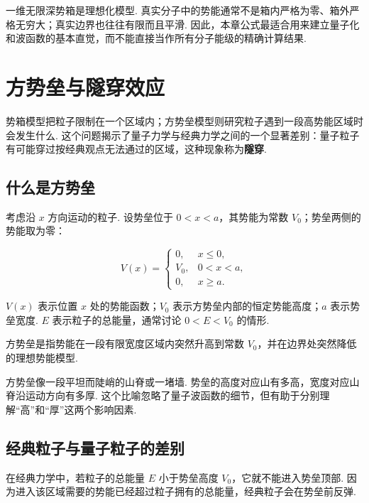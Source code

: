 \documentclass[UTF8,11pt,a4paper,openany]{ctexbook}
\newcommand{\term}[1]{\textbf{#1}}
\begin{document}
\begin{limitbox}
一维无限深势箱是理想化模型. 真实分子中的势能通常不是箱内严格为零、箱外严格无穷大；真实边界也往往有限而且平滑. 因此，本章公式最适合用来建立量子化和波函数的基本直觉，而不能直接当作所有分子能级的精确计算结果. 
\end{limitbox}

\chapter{方势垒与隧穿效应}

势箱模型把粒子限制在一个区域内；方势垒模型则研究粒子遇到一段高势能区域时会发生什么. 这个问题揭示了量子力学与经典力学之间的一个显著差别：量子粒子有可能穿过按经典观点无法通过的区域，这种现象称为\term{隧穿}. 

\section{什么是方势垒}

考虑沿 $x$ 方向运动的粒子. 设势垒位于 $0<x<a$，其势能为常数 $V_0$；势垒两侧的势能取为零：

\[
V(x)=
\begin{cases}
0,&x\leq0,\\
V_0,&0<x<a,\\
0,&x\geq a.
\end{cases}
\]

\begin{notationbox}
$V(x)$ 表示位置 $x$ 处的势能函数；$V_0$ 表示方势垒内部的恒定势能高度；$a$ 表示势垒宽度. $E$ 表示粒子的总能量，通常讨论 $0<E<V_0$ 的情形. 
\end{notationbox}

\begin{definitionbox}
方势垒是指势能在一段有限宽度区域内突然升高到常数 $V_0$，并在边界处突然降低的理想势能模型. 
\end{definitionbox}

\begin{analogybox}
方势垒像一段平坦而陡峭的山脊或一堵墙. 势垒的高度对应山有多高，宽度对应山脊沿运动方向有多厚. 这个比喻忽略了量子波函数的细节，但有助于分别理解“高”和“厚”这两个影响因素. 
\end{analogybox}

\section{经典粒子与量子粒子的差别}

在经典力学中，若粒子的总能量 $E$ 小于势垒高度 $V_0$，它就不能进入势垒顶部. 因为进入该区域需要的势能已经超过粒子拥有的总能量，经典粒子会在势垒前反弹. 
\end{document}
